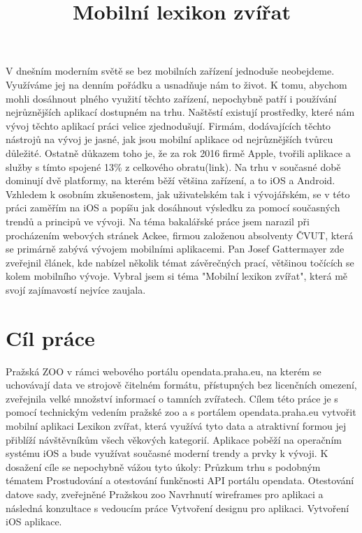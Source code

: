 \documentclass[thesis=B,czech]{FITthesis}[2012/06/26]
\title{Mobilní lexikon zvířat}
\begin{document}

\begin{introduction}
V dnešním moderním světě se bez mobilních zařízení jednoduše neobejdeme. Využíváme jej na denním pořádku a usnadňuje nám to život. K tomu, abychom mohli dosáhnout plného využití těchto zařízení, nepochybně patří i používání nejrůznějších aplikací dostupném na trhu. Naštěstí existují prostředky, které nám vývoj těchto aplikací práci velice zjednodušují. Firmám, dodávajících těchto nástrojů na vývoj je jasné, jak jsou mobilní aplikace od nejrůznějších tvůrcu důležité. Ostatně důkazem toho je, že za rok 2016 firmě Apple, tvořili aplikace a služby s tímto spojené 13\% z celkového obratu(link).  Na trhu v současné době dominují dvě platformy, na kterém běží většina zařízení, a to iOS a Android. Vzhledem k osobním zkušenostem, jak uživatelském tak i vývojářském, se v této práci zaměřím na iOS a popíšu jak dosáhnout výsledku za pomocí současných trendů a principů ve vývoji.
Na téma  bakalářské práce jsem narazil při procházením webových stránek Ackee, firmou založenou absolventy ČVUT, která se primárně zabývá vývojem mobilními aplikacemi. Pan Josef Gattermayer zde zveřejnil článek, kde nabízel několik témat závěrečných prací, většinou točících se kolem mobilního vývoje. Vybral jsem si téma "Mobilní lexikon zvířat", která mě svojí zajímavostí nejvíce zaujala. 
\end{introduction}

\chapter{Cíl práce}
Pražská ZOO v rámci webového portálu opendata.praha.eu, na kterém se uchovávají data ve strojově čitelném formátu, přístupných bez licenčních omezení, zveřejnila velké množství informací o tamních zvířatech.
Cílem této práce je s pomocí technickým vedením pražské zoo a s portálem opendata.praha.eu vytvořit mobilní aplikaci Lexikon zvířat, která využívá tyto data a atraktivní formou jej přiblíží návštěvníkům všech věkových kategorií. Aplikace poběží na operačním systému iOS a bude využívat současné moderní trendy a prvky k vývoji. K dosažení cíle se nepochybně vážou tyto úkoly:
Průzkum trhu s podobným tématem
Prostudování a otestování funkčnosti API portálu opendata.
Otestování datove sady, zveřejněné Pražskou zoo
Navrhnutí wireframes pro aplikaci a následná konzultace s vedoucím práce
Vytvoření designu pro aplikaci.
Vytvoření iOS aplikace.
\end{document}
